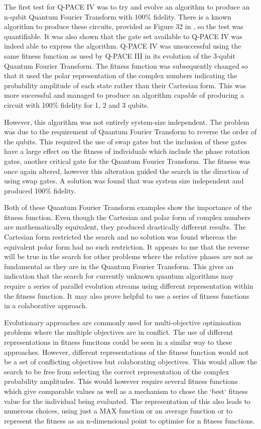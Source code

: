 \documentclass[authoryearcitations]{UoYCSproject}
\begin{document}
The first test for Q-PACE IV was to try and evolve an algorithm to produce an n-qubit Quantum Fourier Transform with 100\% fidelity.
There is a known algorithm to produce these circuits, provided as Figure 32 in \cite{masseythesis}, so the test was quantifiable.
It was also shown that the gate set available to Q-PACE IV was indeed able to express the algorithm.
Q-PACE IV was unsuccessful using the same fitness function as used by Q-PACE III in its evolution of the 3-qubit Quantum Fourier Transform.
The fitness function was subsequently changed so that it used the polar representation of the complex numbers indicating the probability amplitude of each state rather than their Cartesian form.
This was more successful and managed to produce an algorithm capable of producing a circuit with 100\% fidelity for 1, 2 and 3 qubits.

However, this algorithm was not entirely system-size independent.
The problem was due to the requirement of Quantum Fourier Transform to reverse the order of the qubits.
This required the use of swap gates but the inclusion of these gates have a large effect on the fitness of individuals which include the phase rotation gates, another critical gate for the Quantum Fourier Transform.
The fitness was once again altered, however this alteration guided the search in the direction of using swap gates.
A solution was found that was system size independent and produced 100\% fidelity.

Both of these Quantum Fourier Transform examples show the importance of the fitness function.
Even though the Cartesian and polar form of complex numbers are mathematically equivalent, they produced drastically different results.
The Cartesian form restricted the search and no solution was found whereas the equivalent polar form had no such restriction.
It appears to me that the reverse will be true in the search for other problems where the relative phases are not as fundamental as they are in the Quantum Fourier Transform.
This gives an indication that the search for currently unknown quantum algorithms may require a series of parallel evolution streams using different representation within the fitness function.
It may also prove helpful to use a series of fitness functions in a colaborative approach.

Evolutionary approaches are commonly used for multi-objective optimisation problems where the multiple objectives are in conflict.
The use of different representations in fitness funcitons could be seen in a similar way to these approaches.
However, different representations of the fitness function would not be a set of conflicting objectives but colaborating objectives.
This would allow the search to be free from selecting the correct representation of the complex probability amplitudes.
This would however require several fitness functions which give comparable values as well as a mechanism to chose the `best` fitness value for the individual being evaluated.
The representation of this also leads to numerous choices, using just a MAX function or an average function or to represent the fitness as an n-dimensional point to optimise for n fitness functions.
\end{document}
